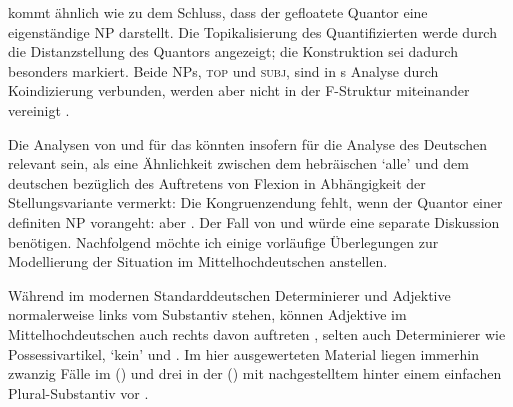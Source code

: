\citet[533--534]{spector2009} kommt ähnlich wie \citet[29]{pittner1995} zu dem
Schluss, dass der gefloatete Quantor eine eigenständige NP darstellt. Die
Topikalisierung des Quantifizierten werde durch die Distanzstellung des
Quantors angezeigt; die Konstruktion sei dadurch besonders markiert. Beide NPs,
\textsc{top} und \textsc{subj}, sind in \citeauthor{spector2009}s Analyse durch
Koindizierung verbunden, werden aber nicht in der F-Struktur miteinander
vereinigt \autocite[vgl.][99]{bresnanetal2016}.

Die Analysen von \citet{shlonsky1991} und \citet{spector2009} für das
 könnten insofern für die Analyse des Deutschen
relevant sein, als \citet[179]{merchant1996} eine Ähnlichkeit zwischen dem
hebräischen  `alle' und dem deutschen
 bezüglich des Auftretens von Flexion in Abhängigkeit der
Stellungsvariante vermerkt: Die Kongruenzendung fehlt, wenn der Quantor einer
definiten NP vorangeht:  aber . Der Fall von  und  würde eine separate Diskussion benötigen.
Nachfolgend möchte ich einige vorläufige Überlegungen zur Modellierung der
Situation im Mittelhochdeutschen anstellen.

Während im modernen Standarddeutschen Determinierer und Adjektive normalerweise
links vom Substantiv stehen, können Adjektive im
Mittelhochdeutschen auch rechts davon auftreten
\autocite[185--186, 237--243]{ksw2}, selten auch Determinierer wie
Possessivartikel,  `kein' und 
\autocite[515--517, 551--552, 623--624]{ksw2}. Im hier ausgewerteten Material
liegen immerhin zwanzig Fälle im 
(\CAO) und drei in der  (\KC) mit nachgestelltem
 hinter einem einfachen Plural-Substantiv vor
.



